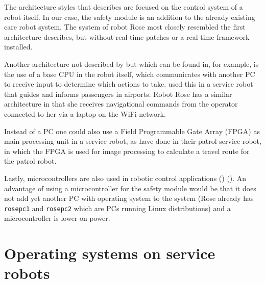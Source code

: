 \documentclass[12pt]{scrreprt}
\begin{document}
\par
The architecture styles that \citeauthor{bouchier} describes are focused on the control system of a robot itself. In our case, the safety module is an addition to the already existing care robot system. The system of robot Rose most closely resembled the first architecture \citeauthor{bouchier} describes, but without real-time patches or a real-time framework installed. %
\par
Another architecture not described by \citeauthor{bouchier} but which can be found in, for example, \cite{spencer} is the use of a base CPU in the robot itself, which communicates with another PC to receive input to determine which actions to take. \citeauthor{spencer} used this in a service robot that guides and informs passengers in airports. Robot Rose has a similar architecture in that she receives navigational commands from the operator connected to her via a laptop on the WiFi network. 
\par
Instead of a PC one could also use a Field Programmable Gate Array (FPGA) as main processing unit in a service robot, as \citeauthor{visual_xenomai} have done in their patrol service robot, in which the FPGA is used for image processing to calculate a travel route for the patrol robot. 
\par
Lastly, microcontrollers are also used in robotic control applications (\cite{microcontroller1}) (\cite{microcontroller2}). An advantage of using a microcontroller for the safety module would be that it does not add yet another PC with operating system to the system (Rose already has \texttt{rosepc1} and \texttt{rosepc2} which are PCs running Linux distributions) and a microcontroller is lower on power.

\section{Operating systems on service robots}
\label{tOS}
\end{document}
